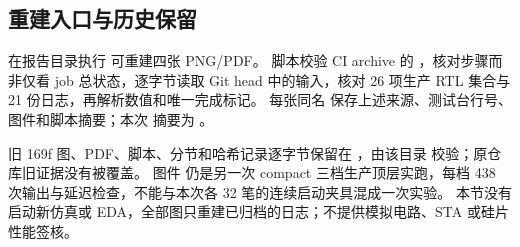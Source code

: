 \subsection{重建入口与历史保留}
在报告目录执行  可重建四张 PNG/PDF。
脚本校验 CI archive 的 ，核对步骤而非仅看 job 总状态，逐字节读取 Git head 中的输入，核对 26 项生产 RTL 集合与 21 份日志，再解析数值和唯一完成标记。
每张同名  保存上述来源、测试台行号、图件和脚本摘要；本次  摘要为
。

旧 169f 图、PDF、脚本、分节和哈希记录逐字节保留在
，由该目录  校验；原仓库旧证据没有被覆盖。
图件  仍是另一次 compact 三档生产顶层实跑，每档 438 次输出与延迟检查，不能与本次各 32 笔的连续启动夹具混成一次实验。
本节没有启动新仿真或 EDA，全部图只重建已归档的日志；不提供模拟电路、STA 或硅片性能签核。
